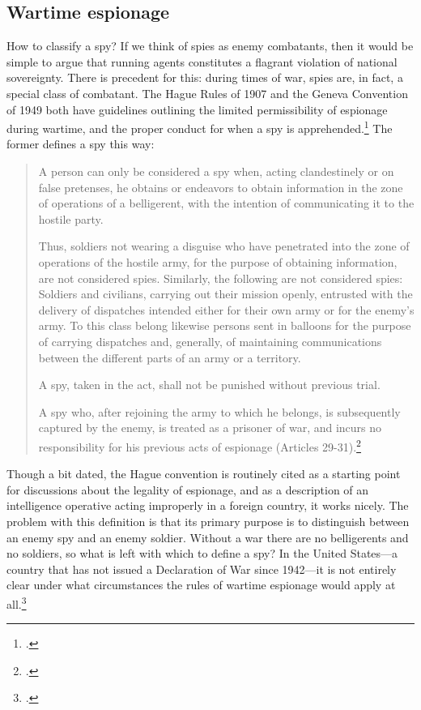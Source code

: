 \documentclass{report}
\begin{document}
\begin{refsegment}
\subsection{Wartime espionage}
How to classify a spy? If we think of spies as enemy combatants, then it would be simple to argue that running agents constitutes a flagrant violation of national sovereignty. There is precedent for this: during times of war, spies are, in fact, a special class of combatant. The Hague Rules of 1907 and the Geneva Convention of 1949 both have guidelines outlining the limited permissibility of espionage during wartime, and the proper conduct for when a spy is apprehended.\footcite[p.~652]{beim_enforcing_2018} The former defines a spy this way:

\begin{quote}
A person can only be considered a spy when, acting clandestinely or on false pretenses, he obtains or endeavors to obtain information in the zone of operations of a belligerent, with the intention of communicating it to the hostile party.

Thus, soldiers not wearing a disguise who have penetrated into the zone of operations of the hostile army, for the purpose of obtaining information, are not considered spies. Similarly, the following are not considered spies: Soldiers and civilians, carrying out their mission openly, entrusted with the delivery of dispatches intended either for their own army or for the enemy's army. To this class belong likewise persons sent in balloons for the purpose of carrying dispatches and, generally, of maintaining communications between the different parts of an army or a territory.

A spy, taken in the act, shall not be punished without previous trial.

A spy who, after rejoining the army to which he belongs, is subsequently captured by the enemy, is treated as a prisoner of war, and incurs no responsibility for his previous acts of espionage (Articles 29-31).\footcite{noauthor_hague_1907}
\end{quote}

Though a bit dated, the Hague convention is routinely cited as a starting point for discussions about the legality of espionage, and as a description of an intelligence operative acting improperly in a foreign country, it works nicely. The problem with this definition is that its primary purpose is to distinguish between an enemy spy and an enemy soldier. Without a war there are no belligerents and no soldiers, so what is left with which to define a spy? In the United States---a country that has not issued a Declaration of War since 1942---it is not entirely clear under what circumstances the rules of wartime espionage would apply at all.\footcite{ncc_staff_when_2018}


\end{refsegment}
\end{document}
